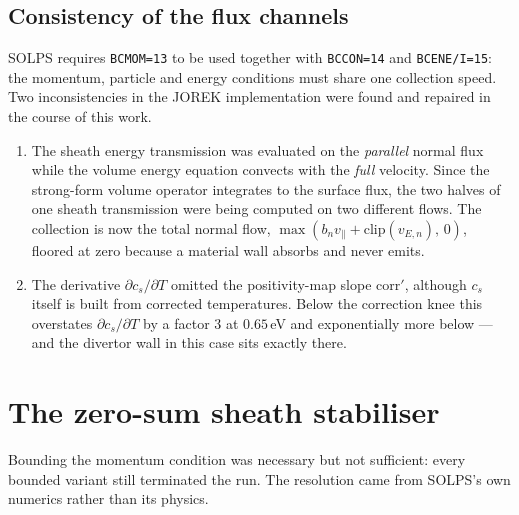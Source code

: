 \documentclass[11pt,a4paper]{article}
\newcommand{\code}[1]{\texttt{\small #1}}
\newcommand{\vpar}{v_\parallel}
\newcommand{\cs}{c_s}
\newcommand{\vEn}{v_{E,n}}
\begin{document}
\subsection{Consistency of the flux channels}
SOLPS requires \code{BCMOM=13} to be used together with \code{BCCON=14} and \code{BCENE/I=15}:
the momentum, particle and energy conditions must share one collection speed. Two inconsistencies
in the JOREK implementation were found and repaired in the course of this work.
\begin{enumerate}\itemsep2pt
\item The sheath energy transmission was evaluated on the \emph{parallel} normal flux while the
volume energy equation convects with the \emph{full} velocity. Since the strong-form volume
operator integrates to the surface flux, the two halves of one sheath transmission were being
computed on two different flows. The collection is now the total normal flow,
$\max(b_n\vpar+\mathrm{clip}(\vEn),\,0)$, floored at zero because a material wall absorbs and never
emits.
\item The derivative $\partial \cs/\partial T$ omitted the positivity-map slope
$\mathrm{corr}'$, although $\cs$ itself is built from corrected temperatures. Below the correction
knee this overstates $\partial \cs/\partial T$ by a factor $3$ at $0.65\,$eV and exponentially more
below --- and the divertor wall in this case sits exactly there.
\end{enumerate}

\section{The zero-sum sheath stabiliser}\label{sec:stab}

Bounding the momentum condition was necessary but not sufficient: every bounded variant still
terminated the run. The resolution came from SOLPS's own numerics rather than its physics.
\end{document}
